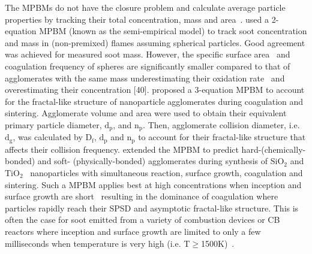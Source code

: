The MPBMs do not have the closure problem and calculate average particle properties by tracking their total concentration, mass \citep{kruis1993simple} and area~\citep{tsantilis2004soft, lindstedt1994simplified}. \citet{kruis1993simple} used a 2-equation MPBM (known as the semi-empirical model) to track soot concentration and mass in (non-premixed) flames assuming spherical particles. Good agreement was achieved for measured soot mass. However, the specific surface area~\citep{lindstedt1994simplified} and coagulation frequency of spheres are significantly smaller compared to that of agglomerates with the same mass underestimating their oxidation rate~\citep{kelesidis2019estimating} and overestimating their concentration [40]. \citet{kruis1993simple} proposed a 3-equation MPBM to account for the fractal-like structure of nanoparticle agglomerates during coagulation and sintering. Agglomerate volume and area were used to obtain their equivalent primary particle diameter, $\mathrm{d_p}$, and $\mathrm{n_p}$. Then, agglomerate collision diameter, i.e. $\mathrm{d_g}$, was calculated by $\mathrm{D_f}$, $\mathrm{d_p}$ and $\mathrm{n_p}$ to account for their fractal-like structure that affects their collision frequency. \citet{tsantilis2004soft} extended the MPBM to predict hard-(chemically-bonded) and soft- (physically-bonded) agglomerates during synthesis of $\mathrm{SiO_2}$ and $\mathrm{TiO_2}$~\citep{grass2006design} nanoparticles with simultaneous reaction, surface growth, coagulation and sintering. Such a MPBM applies best at high concentrations when inception and surface growth are short~\citep{Spicer2002} resulting in the dominance of coagulation where particles rapidly reach their SPSD and asymptotic fractal-like structure. This is often the case for soot emitted from a variety of combustion devices or CB reactors where inception and surface growth are limited to only a few milliseconds when temperature is very high (i.e. T$\ge$1500K)~\citep{kholghy2018reactive}.



% 




